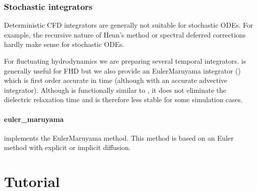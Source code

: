 \documentclass[letterpaper,10pt,english]{sphinxmanual}
\begin{document}
\begin{sphinxVerbatim}[commandchars=\\\{\},formatcom=\scriptsize]
        
\end{sphinxVerbatim}


\subsection{Stochastic integrators}
\label{\detokenize{MinimalPlasmaModel:stochastic-integrators}}\label{\detokenize{MinimalPlasmaModel:chap-misdc}}
Deterministic CFD integrators are generally not suitable for stochastic ODEs. For example, the recursive nature of Heun’s method or spectral deferred corrections hardly make sense for stochastic ODEs.

For fluctuating hydrodynamics we are preparing several temporal integrators.  is generally useful for FHD but we also provide an Euler\sphinxhyphen{}Maruyama integrator () which is first order accurate in time (although with an accurate advective integrator). Although  is functionally similar to , it does not eliminate the dielectric relaxation time and is therefore less stable for some simulation cases.


\subsubsection{euler\_maruyama}
\label{\detokenize{MinimalPlasmaModel:euler-maruyama}}\label{\detokenize{MinimalPlasmaModel:chap-euler-maruyama}}
{\hyperref[\detokenize{MinimalPlasmaModel:chap-euler-maruyama}]{}} implements the Euler\sphinxhyphen{}Maruyama method. This method is based on an Euler method with explicit or implicit diffusion.


\chapter{Tutorial}
\label{\detokenize{index:tutorial}}\label{\detokenize{index:chap-tutorial}}
\end{document}
